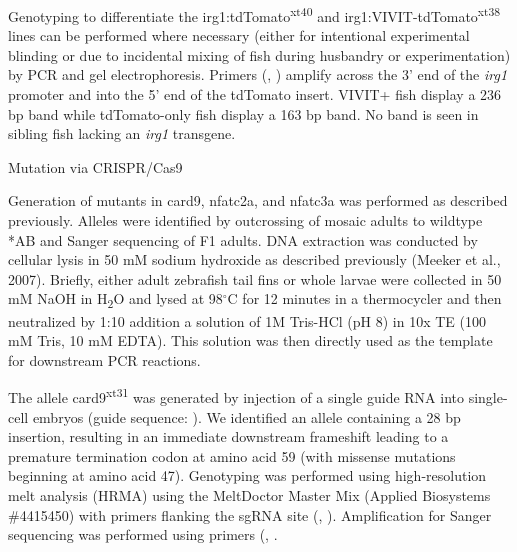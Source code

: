Genotyping to differentiate the irg1:tdTomato\textsuperscript{xt40} and irg1:VIVIT-tdTomato\textsuperscript{xt38} lines can be performed where necessary (either for intentional experimental blinding or due to incidental mixing of fish during husbandry or experimentation) by PCR and gel electrophoresis. Primers (, ) amplify across the 3' end of the \textit{irg1} promoter and into the 5' end of the tdTomato insert. VIVIT+ fish display a 236 bp band while tdTomato-only fish display a 163 bp band. No band is seen in sibling fish lacking an \textit{irg1} transgene. 

Mutation via CRISPR/Cas9

Generation of mutants in card9, nfatc2a, and nfatc3a was performed as described previously. Alleles were identified by outcrossing of mosaic adults to wildtype *AB and Sanger sequencing of F1 adults. DNA extraction was conducted by cellular lysis in 50 mM sodium hydroxide as described previously (Meeker et al., 2007). Briefly, either adult zebrafish tail fins or whole larvae were collected in 50 mM NaOH in H\textsubscript{2}O and lysed at 98$^{\circ}$C for 12 minutes in a thermocycler and then neutralized by 1:10 addition a solution of 1M Tris-HCl (pH 8) in 10x TE (100 mM Tris, 10 mM EDTA). This solution was then directly used as the template for downstream PCR reactions. 

The allele card9\textsuperscript{xt31} was generated by injection of a single guide RNA into single-cell embryos (guide sequence: ). We identified an allele containing a 28 bp insertion, resulting in an immediate downstream frameshift leading to a premature termination codon at amino acid 59 (with missense mutations beginning at amino acid 47). Genotyping was performed using high-resolution melt analysis (HRMA) using the MeltDoctor Master Mix  (Applied Biosystems \#4415450) with primers flanking the sgRNA site (, ). Amplification for Sanger sequencing was performed using primers (, .

